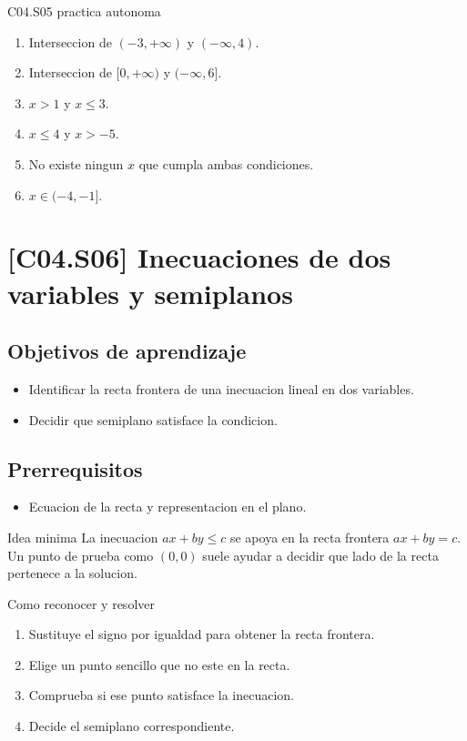 \begin{fullsolution}{C04.S05 practica autonoma}
\begin{enumerate}[label=\textbf{PX-C04.S05-\arabic*:}, leftmargin=*]
  \item Interseccion de \(( -3,+\infty)\) y \((-\infty,4)\).
  \item Interseccion de \([0,+\infty)\) y \((-\infty,6]\).
  \item \(x>1\) y \(x\leq 3\).
  \item \(x\leq 4\) y \(x>-5\).
  \item No existe ningun \(x\) que cumpla ambas condiciones.
  \item \(x\in(-4,-1]\).
\end{enumerate}
\end{fullsolution}

\section{[C04.S06] Inecuaciones de dos variables y semiplanos}

\subsection*{Objetivos de aprendizaje}
\begin{itemize}
  \item Identificar la recta frontera de una inecuacion lineal en dos variables.
  \item Decidir que semiplano satisface la condicion.
\end{itemize}

\subsection*{Prerrequisitos}
\begin{itemize}
  \item Ecuacion de la recta y representacion en el plano.
\end{itemize}

\begin{theorybox}{Idea minima}
La inecuacion \(ax+by\leq c\) se apoya en la recta frontera \(ax+by=c\). Un punto de prueba
como \((0,0)\) suele ayudar a decidir que lado de la recta pertenece a la solucion.
\end{theorybox}

\begin{methodbox}{Como reconocer y resolver}
\begin{enumerate}
  \item Sustituye el signo por igualdad para obtener la recta frontera.
  \item Elige un punto sencillo que no este en la recta.
  \item Comprueba si ese punto satisface la inecuacion.
  \item Decide el semiplano correspondiente.
\end{enumerate}
\end{methodbox}

